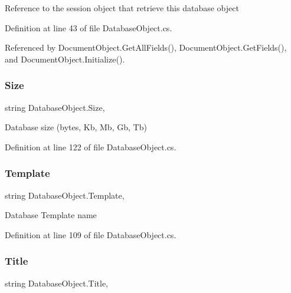 Reference to the session object that retrieve this database object 



Definition at line 43 of file Database\+Object.\+cs.



Referenced by Document\+Object.\+Get\+All\+Fields(), Document\+Object.\+Get\+Fields(), and Document\+Object.\+Initialize().

\mbox{\label{class_database_object_ad86f5dd95a9debdef284e21e32936e9e}} 
\subsubsection{\texorpdfstring{Size}{Size}}
{\footnotesize\ttfamily string Database\+Object.\+Size\hspace{0.3cm}{\ttfamily [get]}, {\ttfamily [set]}}



Database size (bytes, Kb, Mb, Gb, Tb) 



Definition at line 122 of file Database\+Object.\+cs.

\mbox{\label{class_database_object_ac8ecdbe9722c00f787a62aef7d3dfa5a}} 
\subsubsection{\texorpdfstring{Template}{Template}}
{\footnotesize\ttfamily string Database\+Object.\+Template\hspace{0.3cm}{\ttfamily [get]}, {\ttfamily [set]}}



Database Template name 



Definition at line 109 of file Database\+Object.\+cs.

\mbox{\label{class_database_object_a9af3f75274dd39f7fa82a355dc4ddf39}} 
\subsubsection{\texorpdfstring{Title}{Title}}
{\footnotesize\ttfamily string Database\+Object.\+Title\hspace{0.3cm}{\ttfamily [get]}, {\ttfamily [set]}}



